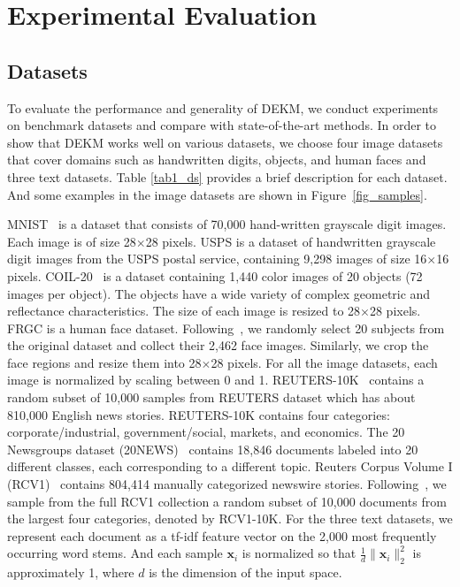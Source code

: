 \section{Experimental Evaluation}

\subsection{Datasets}

To evaluate the performance and generality of DEKM, we conduct experiments on benchmark datasets and compare with state-of-the-art methods. In order to show that DEKM works well on various datasets, we choose four image datasets that cover domains such as handwritten digits, objects,
and human faces and three text datasets. Table \ref{tab1_ds} provides a brief description for each dataset. And some examples in the image datasets are shown in Figure~\ref{fig_samples}.

MNIST~\cite{lecun1998gradient} is a dataset that consists of 70,000 hand-written grayscale digit images. Each image is of size 28$\times$28 pixels. USPS is a dataset of handwritten grayscale digit images from the USPS postal service, containing 9,298 images of size 16$\times$16 pixels. COIL-20~\cite{nene1996columbia} is a dataset containing 1,440 color images of 20 objects (72 images per object). The objects have a wide variety of complex geometric and reflectance characteristics. The size of each image is resized to 28$\times$28 pixels. FRGC is a human face dataset. Following~\cite{yang2016joint}, we randomly select 20 subjects from the original dataset and collect their 2,462 face images. Similarly, we crop the face regions and resize them into 28$\times$28 pixels. For all the image datasets, each image is normalized by scaling between 0 and 1. REUTERS-10K~\cite{DEC_xie2016unsupervised} contains a random subset of 10,000 samples from REUTERS dataset which has about 810,000 English news stories. REUTERS-10K contains four categories: corporate/industrial, government/social, markets, and economics. The 20 Newsgroups dataset (20NEWS)~\cite{lang1995newsweeder} contains 18,846 documents labeled into 20 different classes, each corresponding to a different topic. Reuters Corpus Volume I (RCV1)~\cite{lewis2004rcv1} contains 804,414 manually categorized newswire stories. Following~\cite{fard2020deep}, we sample from the full RCV1 collection a random subset of 10,000 documents from the largest four categories, denoted by RCV1-10K. For the three text datasets, we represent each document as a tf-idf feature vector on the 2,000 most frequently occurring word stems. And each sample $\mathbf{x}_i$ is normalized so that $\frac{1}{d}\lVert\mathbf{x}_i\rVert_2^2$ is approximately 1, where $d$ is the dimension of the input space.

